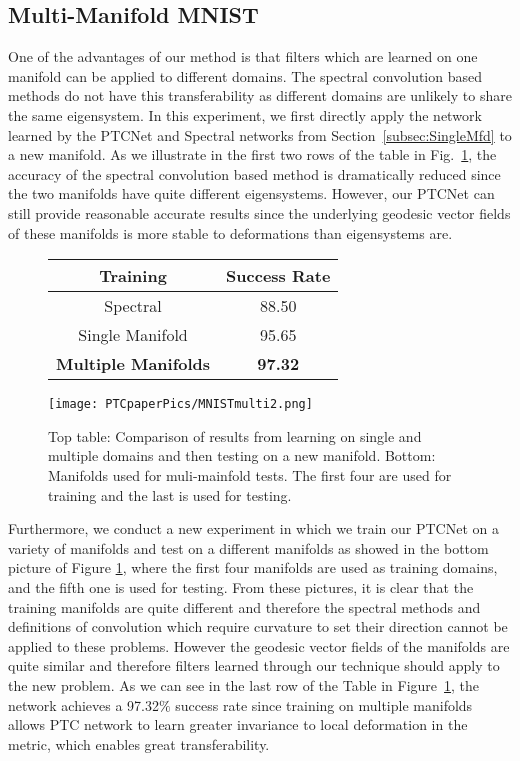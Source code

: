 \documentclass[10pt,twocolumn,letterpaper]{article}
\begin{document}
\subsection{Multi-Manifold MNIST}
One of the advantages of our method is that filters which are learned on one manifold can be applied to different domains. The spectral convolution based methods do not have this transferability as different domains are unlikely to share the same eigensystem. In this experiment, we first directly apply the network learned by the PTCNet and Spectral networks from Section~\ref{subsec:SingleMfd} to a new manifold. As we illustrate in the first two rows of the table in Fig.~\ref{fig:MultiMNIST}, the accuracy of the spectral convolution based method is dramatically reduced since the two manifolds have quite different eigensystems. However, our PTCNet can still provide reasonable accurate results since the underlying geodesic vector fields of these manifolds is more stable to deformations than eigensystems are.

\begin{figure}[htp]
\begin{center}
  \begin{tabular}{ |c | c | }
  \hline
 Training      &  Success Rate  \\ \hline
 Spectral      & 88.50        \\ \hline
 Single Manifold     & 95.65  \\ \hline
 \textbf{Multiple Manifolds} & \textbf{97.32} \\ \hline
  \end{tabular}
\end{center}
\centering
\texttt{[image: PTCpaperPics/MNISTmulti2.png]}
\caption{Top table: Comparison of results from learning on single and multiple domains and then testing on a new manifold. Bottom: Manifolds used for muli-mainfold tests. The first four are used for training and the last is used for testing.  }
\label{fig:MultiMNIST}
\end{figure}


Furthermore, we conduct a new experiment in which we train our PTCNet on a variety of manifolds and test on a different manifolds as showed in the bottom picture of Figure \ref{fig:MultiMNIST}, where the first four manifolds are used as training domains, and the fifth one is used for testing. From these pictures, it is clear that the training manifolds are quite different and therefore the spectral methods and definitions of convolution which require curvature to set their direction \cite{boscaini2016learning} cannot be applied to these problems. However the geodesic vector fields  of the manifolds are quite similar and therefore filters learned through our technique should apply to the new problem. As we can see in the last row of the Table in Figure~\ref{fig:MultiMNIST}, the network achieves a 97.32$\%$ success rate since training on multiple manifolds allows PTC network to learn greater invariance to local deformation in the metric, which enables great transferability.
\end{document}
